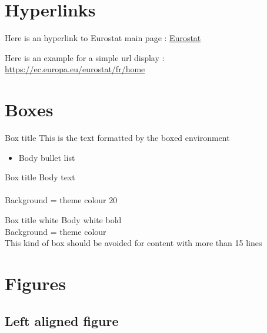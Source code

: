 \documentclass[Theme1]{{template_material/eurostat}}
\begin{document}
\section{Hyperlinks}

Here is an hyperlink to Eurostat main page : \href{https://ec.europa.eu/eurostat/fr/home}{Eurostat} 

Here is an example for a simple url display : \url{https://ec.europa.eu/eurostat/fr/home}

\newpage %


\section{Boxes}

\begin{boxe1}{Box title}
    This is the text formatted by the boxed environment
    \begin{itemize}
        \item Body bullet list
    \end{itemize}
\end{boxe1}

\vspace{1cm}

\begin{boxe2}{Box title}
    Body text \\
     \\
    Background = theme colour 20
\end{boxe2}

\vspace{1cm}

\begin{boxe3}{Box title white}
    Body white bold \\
    Background = theme colour \\
    This kind of box should be avoided for content with more than 15 lines
\end{boxe3}

\newpage %
\section{Figures}

\subsection{Left aligned figure}
\end{document}
